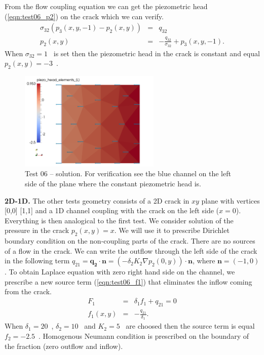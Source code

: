 From the flow coupling equation we can get the piezometric head (\ref{eqn:test06_p2}) on the crack which we can verify.
\begin{eqnarray} 
     \sigma_{32}  ( p_3(x,y,-1) - p_2(x,y) ) &=& q_{32} \nonumber\\
     p_2(x,y) &=& -\frac{q_{32}}{\sigma_{32}} + p_3(x,y,-1) \label{eqn:test06_p2}.
\end{eqnarray}   
When $\sigma_{32} = 1$~ is set then the piezometric head in the crack is constant and equal $p_2(x,y) = -3$~.

%
\begin{figure}[h!]
\centering
\includegraphics[width=0.6\textwidth]{tests_graphics/06_result_21d.pdf}
\caption{Test 06 -- solution. For verification see the blue channel on the left side of the plane where the constant piezometric head is.}
\label{fig:test6_solution_32d}
\end{figure}
%
\textbf{2D-1D.}
The other tests geometry consists of a 2D crack in $xy$ plane with vertices [0,0] [1,1] and a 1D channel coupling with the crack on the left side ($x=0$). 
Everything is then analogical to the first test.
We consider solution of the pressure in the crack $p_2(x,y) = x$. We will use it to prescribe Dirichlet boundary condition on the non-coupling parts of the crack.
There are no sources of a flow in the crack. 
We can write the outflow through the left side of the crack in the following term $q_{21} = \mathbf{q_2} \cdot \mathbf{n} = (- \delta_2 K_2 \nabla p_2(0,y))\cdot \mathbf{n}$,
where $\mathbf{n}=(-1,0)$.
To obtain Laplace equation with zero right hand side on the channel, we prescribe a new source term (\ref{eqn:test06_f1}) that eliminates the inflow coming from the crack.         
\begin{eqnarray}
    F_1 &=& \delta_1  f_1 + q_{21} = 0   \nonumber\\
    f_1(x,y) &=& -\frac{q_{21}}{\delta_1}   \label{eqn:test06_f1}.
\end{eqnarray}
When $\delta_1 = 20$~, $\delta_2 = 10$~ and $K_2 = 5$~ are choosed then the source term is equal $f_2 = -2.5$~.
Homogenous Neumann condition is prescribed on the boundary of the fraction (zero outflow and inflow).


